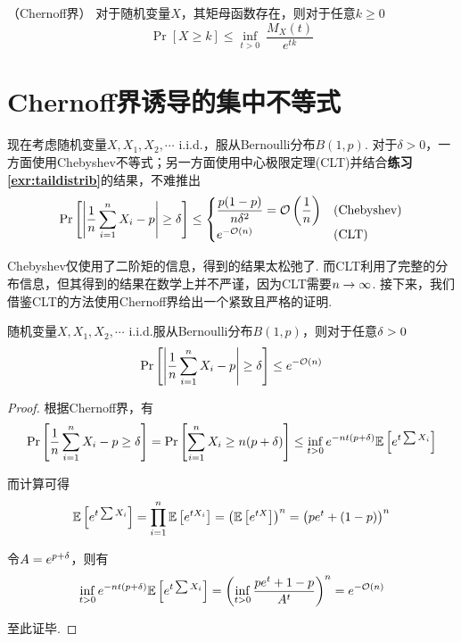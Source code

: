 \begin{theorem}（Chernoff界）
     对于随机变量$X$，其矩母函数存在，则对于任意$k\ge 0$
    \[
     \Pr[X \ge k] \le \inf_{t > 0} \ \dfrac{M_X(t)}{e^{tk}}
    \]
\end{theorem}

\section{Chernoff界诱导的集中不等式}

现在考虑随机变量$X, X_1, X_2, \cdots$ i.i.d.，服从Bernoulli分布$B(1,p)$. 对于$\delta > 0$，一方面使用Chebyshev不等式；另一方面使用中心极限定理(CLT)并结合\textbf{练习\ref{exr:taildistrib}}的结果，不难推出
\[
\Pr\left[
    \left\vert
        \dfrac 1n \sum_{i=1}^n X_i - p
    \right\vert \ge \delta
\right] \le \begin{cases}
\dfrac{p(1-p)}{n\delta^2} = \mathcal{O}\left(\dfrac 1n \right) & \text{(Chebyshev)} \\
e^{-\mathcal{O}(n)} & \text{(CLT)}
\end{cases}
\]

Chebyshev仅使用了二阶矩的信息，得到的结果太松弛了. 而CLT利用了完整的分布信息，但其得到的结果在数学上并不严谨，因为CLT需要$n \rightarrow \infty$. 接下来，我们借鉴CLT的方法使用Chernoff界给出一个紧致且严格的证明. 

\begin{theorem} \label{thm:bernoulli}
    随机变量$X, X_1, X_2, \cdots$ i.i.d.服从Bernoulli分布$B(1,p)$，则对于任意$\delta > 0$ 
    \[
    \Pr\left[
        \left\vert
            \dfrac 1n \sum_{i=1}^n X_i - p
        \right\vert \ge \delta
    \right] \le e^{-\mathcal{O} (n)}
    \]
\end{theorem}
\begin{proof}
    根据Chernoff界，有 
    \[
    \Pr\left[
        \dfrac 1n \sum_{i=1}^n X_i - p \ge \delta
    \right] = \Pr \left[
        \sum_{i=1}^n X_i \ge n(p + \delta)
    \right] \le \inf_{t > 0} e^{-nt(p + \delta)} \mathbb{E}\left[e^{t\sum X_i}\right]
    \]

    而计算可得
    \[
    \mathbb{E}\left[
        e^{t \sum X_i}
    \right] = \prod_{i=1}^n \mathbb{E}\left[
        e^{tX_i}
    \right] = {\left(
        \mathbb{E}\left[
            e^{tX}
        \right]
    \right)}^n = {\left(
        p e^t + (1-p)
    \right)}^n
    \]

    令$A = e^{p + \delta}$，则有
    \[
    \inf_{t > 0} e^{-nt(p + \delta)} \mathbb{E}\left[e^{t\sum X_i}\right] = {\left(
        \inf_{t > 0} \dfrac{pe^t + 1-p}{A^t}
    \right)}^n = e^{-\mathcal{O} (n)}
    \]

    至此证毕.
\end{proof}

